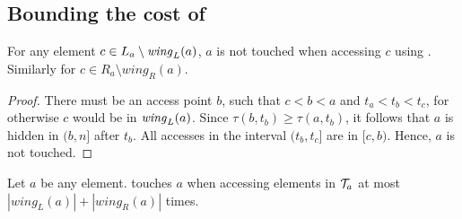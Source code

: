 \subsection{Bounding the cost of \greedy}  

\begin{lemma}
For any element $c\in L_a \setminus \mathit{wing}_{L}(a)$, $a$ is not touched when accessing $c$ using \greedy. Similarly for $c \in R_a \setminus wing_R(a)$.  
\end{lemma}
\begin{proof}
There must be an access point $b$, such that $c<b<a$ and $t_a<t_b<t_c$, for otherwise $c$ would be in $\mathit{wing}_{L}(a)$. Since $\tau(b,t_b) \geq \tau(a,t_b)$, it follows that $a$ is hidden in $(b,n]$ after $t_b$. All accesses in the interval $(t_b, t_c]$ are in $[c,b)$. Hence, $a$ is not touched.
\end{proof}
\begin{corollary}\label{lem_pre1} Let $a$ be any element. 
\greedy touches $a$ when accessing elements in ${\mathcal T}_a$ at most $|wing_L(a)| + |wing_R(a)|$ times.  
\end{corollary}


